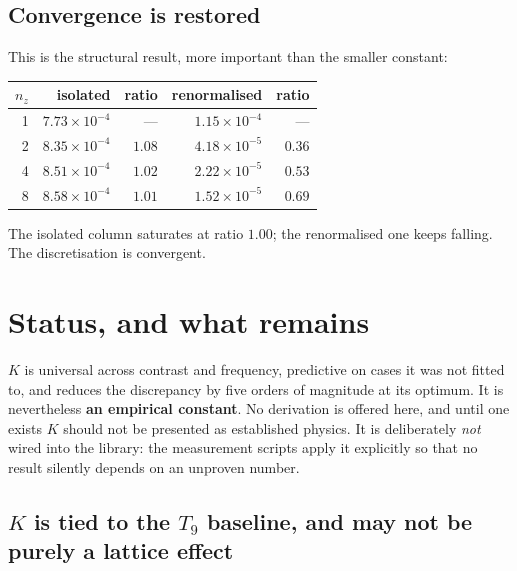 \documentclass[11pt,a4paper]{article}
\newcommand{\Kren}{K}
\begin{document}
\subsection{Convergence is restored}

This is the structural result, more important than the smaller constant:

\begin{center}
\begin{tabular}{rrrrr}
\toprule
$n_z$ & isolated & ratio & renormalised & ratio \\
\midrule
1 & $7.73\times10^{-4}$ & --- & $1.15\times10^{-4}$ & --- \\
2 & $8.35\times10^{-4}$ & $1.08$ & $4.18\times10^{-5}$ & $0.36$ \\
4 & $8.51\times10^{-4}$ & $1.02$ & $2.22\times10^{-5}$ & $0.53$ \\
8 & $8.58\times10^{-4}$ & $1.01$ & $1.52\times10^{-5}$ & $0.69$ \\
\bottomrule
\end{tabular}
\end{center}

The isolated column saturates at ratio $1.00$; the renormalised one keeps
falling. The discretisation is convergent.

\section{Status, and what remains}

\begin{tcolorbox}[colback=orange!6,colframe=orange!55!black,
  title={$\Kren$ is measured, not derived}]
$\Kren$ is universal across contrast and frequency, predictive on cases it was
not fitted to, and reduces the discrepancy by five orders of magnitude at its
optimum. It is nevertheless \textbf{an empirical constant}. No derivation is
offered here, and until one exists $\Kren$ should not be presented as
established physics. It is deliberately \emph{not} wired into the library: the
measurement scripts apply it explicitly so that no result silently depends on an
unproven number.
\end{tcolorbox}

\subsection{$\Kren$ is tied to the $T_9$ baseline, and may not be purely a
lattice effect}
\label{sec:t27-caveat}
\end{document}
